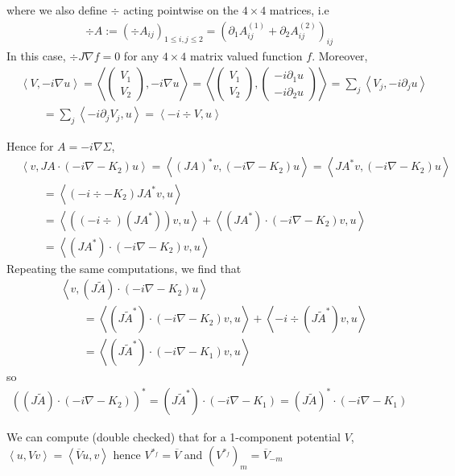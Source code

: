 \documentclass[11pt,a4paper,reqno,french,tikz]{amsart}
\newcommand{\pa}[1]{\left( #1 \right)} %
\newcommand{\ps}[1]{\left< #1 \right>} %
\newcommand{\na}{\nabla} %
\newcommand{\mat}[1]{\begin{pmatrix} #1 \end{pmatrix}} %
\begin{document}
where we also define $\div$ acting pointwise on the $4\times 4$ matrices, i.e
\begin{align*}
\div A := \pa{\div A_{ij}}_{1 \le i,j \le 2} = \pa{\partial_1 A^{(1)}_{ij} + \partial_2 A^{(2)}_{ij}}_{ij}
\end{align*}
In this case, $\div J \na f = 0$ for any $4 \times 4$ matrix valued function $f$. Moreover,
\begin{align*}
	& \ps{V, -i\na u} = \ps{\mat{V_1 \\ V_2}, -i\na u} = \ps{\mat{V_1 \\ V_2}, \mat{-i\partial_1 u \\ -i\partial_2 u}} =\sum_j  \ps{V_j,-i\partial_j u} \\
&\qquad = \sum_j \ps{-i\partial_j V_j,u} = \ps{-i\div V, u}
\end{align*}

Hence for $A = -i\na \Sigma$,
\begin{align*}
	&\ps{v, JA \cdot \pa{-i\na -K_2} u} = \ps{\pa{JA}^* v, \pa{-i\na -K_2}u} = \ps{JA^* v, \pa{-i\na -K_2}u} \\
	& \qquad =  \ps{\pa{-i\div -K_2}JA^* v, u} \\
	& \qquad = \ps{ \pa{\pa{-i\div }\pa{JA^*}}v , u} + \ps{(JA^*) \cdot \pa{-i\na -K_2}v , u} \\
	& \qquad = \ps{(JA^*) \cdot\pa{-i\na -K_2}v , u}
\end{align*}
Repeating the same computations, we find that
\begin{align*}
& \ps{v, \pa{J \widetilde{A}} \cdot \pa{-i\na -K_2} u} \\
& \qquad = \ps{\pa{J \widetilde{A}^*} \cdot \pa{-i\na -K_2} v,u} + \ps{-i\div \pa{J \widetilde{A}^*} v,u} \\
& \qquad = \ps{\pa{J \widetilde{A}^*} \cdot \pa{-i\na - K_1} v,u}
\end{align*}
so 
\begin{align*}
\pa{\pa{J \widetilde{A}} \cdot \pa{-i\na -K_2}}^* = \pa{J \widetilde{A}^*} \cdot \pa{-i\na - K_1} = \pa{J \widetilde{A}}^* \cdot \pa{-i\na - K_1}
\end{align*}

We can compute (double checked) that for a 1-component potential $V$, $\ps{u, V v} = \ps{\overline{V} u,v}$ hence $V^{*_f} = \overline{V}$ and $\pa{V^{*_f}}_m = \overline{V}_{-m}$
\end{document}
